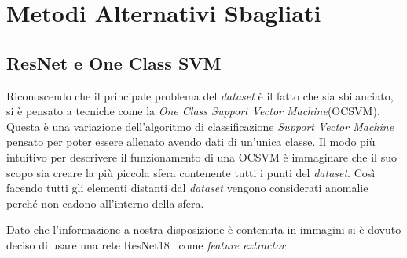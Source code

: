 
\chapter{Metodi Alternativi Sbagliati}


\section{ResNet e One Class SVM}
Riconoscendo che il principale problema del \textit{dataset} è il fatto che sia sbilanciato, si è pensato a tecniche come la \textit{One Class Support Vector Machine}(OCSVM).
Questa è una variazione dell'algoritmo di classificazione \textit{Support Vector Machine} pensato per poter essere allenato avendo dati di un'unica classe.
Il modo più intuitivo per descrivere il funzionamento di una OCSVM è immaginare che il suo scopo sia creare la più piccola sfera contenente tutti i punti del \textit{dataset}.
Così facendo tutti gli elementi distanti dal \textit{dataset} vengono considerati anomalie perché non cadono all'interno della sfera.

Dato che l'informazione a nostra disposizione è contenuta in immagini si è dovuto deciso di usare una rete ResNet18~\cite{resnet} come \textit{feature extractor}
















